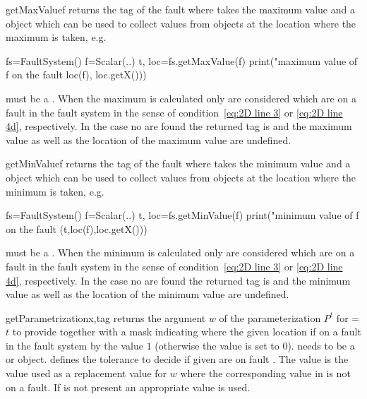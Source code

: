 \begin{methoddesc}[FaultSystem]{getMaxValue}{f}
returns the tag of the fault where  takes the maximum value and a
 object which can be used to collect values from \Data objects
at the location where the maximum is taken, e.g.
\begin{python}
       fs=FaultSystem()
       f=Scalar(..)
       t, loc=fs.getMaxValue(f)
       print("maximum value of f on the fault %
             loc(f), loc.getX()))
\end{python}
 must be a \Scalar. When the maximum is calculated only
\DataSamplePoints are considered which are on a fault in the fault system in
the sense of condition~\ref{eq:2D line 3} or \ref{eq:2D line 4d}, respectively.
In the case no \DataSamplePoints are found the returned tag is  and
the maximum value as well as the location of the maximum value are undefined.
\end{methoddesc}

\begin{methoddesc}[FaultSystem]{getMinValue}{f}
returns the tag of the fault where  takes the minimum value and a
 object which can be used to collect values from \Data objects
at the location where the minimum is taken, e.g.
\begin{python}
  fs=FaultSystem()
  f=Scalar(..)
  t, loc=fs.getMinValue(f)
  print("minimum value of f on the fault %
      (t,loc(f),loc.getX()))
\end{python}
 must be a \Scalar. When the minimum is calculated only
\DataSamplePoints are considered which are on a fault in the fault system in
the sense of condition~\ref{eq:2D line 3} or \ref{eq:2D line 4d}, respectively.
In the case no \DataSamplePoints are found the returned tag is  and
the minimum value as well as the location of the minimum value are undefined.
\end{methoddesc}

\begin{methoddesc}[FaultSystem]{getParametrization}{x,tag }
returns the argument $w$ of the parameterization $P^t$ for =$t$ to
provide  together with a mask indicating where the given location if on
a fault in the fault system by the value $1$ (otherwise the value is set to $0$).
 needs to be a \Vector or \numpyNDA object.
 defines the tolerance to decide if given \DataSamplePoints are on
fault . The value  is the value used as a replacement
value for $w$ where the corresponding value in  is not on a fault.
If  is not present an appropriate value is used.
\end{methoddesc}
 
